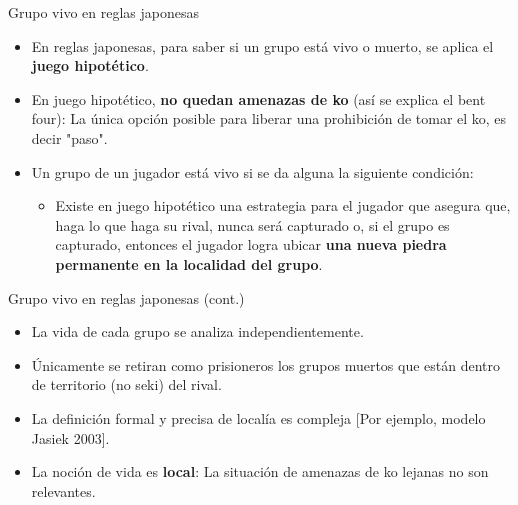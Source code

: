 \documentclass{beamer}
\begin{document}
\begin{frame}{Grupo vivo en reglas japonesas}
    \begin{itemize}
        \item En reglas japonesas, para saber si un grupo está vivo o muerto, se aplica el \textbf{juego hipotético}.
        \item En juego hipotético, \textbf{no quedan amenazas de ko} (así se explica el bent four): La única opción posible para liberar una prohibición de tomar el ko, es decir "paso".
        \item Un grupo de un jugador está vivo si se da alguna la siguiente condición:
            \begin{itemize}
                \item Existe en juego hipotético una estrategia para el jugador que asegura que, haga lo que haga su rival, nunca será capturado o, si el grupo es capturado, entonces
                 el jugador logra ubicar \textbf{una nueva piedra permanente en la localidad del grupo}. 
            \end{itemize}
    \end{itemize}
    
\end{frame}

\begin{frame}{Grupo vivo en reglas japonesas (cont.)}
    \begin{itemize}
        \item La vida de cada grupo se analiza independientemente.
        \item Únicamente se retiran como prisioneros los grupos muertos que están dentro de territorio (no seki) del rival.
        \item La definición formal y precisa de localía es compleja [Por ejemplo, modelo Jasiek 2003].
        \item La noción de vida es \textbf{local}: La situación de amenazas de ko lejanas no son relevantes.
    \end{itemize}
    
\end{frame}
\end{document}
